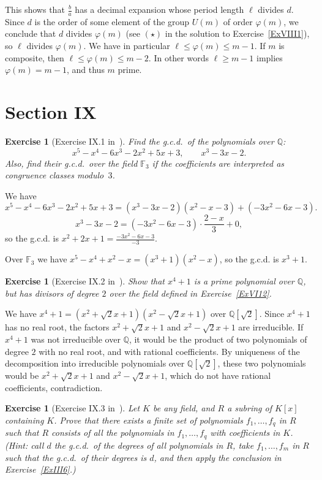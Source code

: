 \documentclass[12pt,letterpaper]{article}
\newcommand{\F}{\mathbb{F}}
\newcommand{\Q}{\mathbb{Q}}
\newtheorem{exer}[thm]{Exercise}
\theoremstyle{definition}
\begin{document}
This shows that $\frac{b}{a}$ has a decimal expansion whose period length $\ell$ divides $d$. Since $d$ is the order of some element of the group $U(m)$ of order $\varphi(m)$, we conclude that $d$ divides $\varphi(m)$ (see $(\star)$ in the solution to Exercise~\ref{ExVIII1}), so $\ell$ divides $\varphi(m)$. We have in particular $\ell\le\varphi(m)\le m-1$. If $m$ is composite, then $\ell\le\varphi(m)\le m-2$. In other words $\ell\ge m-1$ implies $\varphi(m)=m-1$, and thus $m$ prime. 

\section{Section IX} %

\begin{exer}[Exercise IX.1 in~\cite{weil1979}]
Find the g.c.d.\ of the polynomials over $\Q$:
\[
x^5-x^4-6x^3-2x^2+5x+3, \qquad x^3-3x-2.
\]
Also, find their g.c.d.\ over the field $\F_3$ if the coefficients are interpreted as congruence classes modulo~$3$.
\end{exer}

We have 
$$
x^5-x^4-6x^3-2x^2+5x+3=(x^3-3x-2)(x^2-x-3)+(-3x^2-6x-3).
$$ 
$$
x^3-3x-2=(-3x^2-6x-3)\cdot\frac{2-x}{3}+0,
$$ 
so the g.c.d. is $x^2+2x+1=\frac{-3 x^2 - 6 x - 3}{-3}$. 

Over $\F_3$ we have \(x^5-x^4+x^2-x=(x^3+1)(x^2-x)\), so the g.c.d. is \(x^3+1\). 

\begin{exer}[Exercise IX.2 in~\cite{weil1979}]
Show that $x^4+1$ is a prime polynomial over $\Q$, but has divisors of degree $2$ over the field defined in Exercise~\ref{ExVI12}.
\end{exer}

We have $x^4+1=(x^2+\sqrt{2}x+1)(x^2-\sqrt{2}x+1)$ over $\Q[\sqrt{2}]$. Since $x^4+1$ has no real root, the factors $x^2+\sqrt{2}x+1$ and $x^2-\sqrt{2}x+1$ are irreducible. If $x^4+1$ was not irreducible over $\Q$, it would be the product of two polynomials of degree $2$ with no real root, and with rational coefficients. By uniqueness of the decomposition into irreducible polynomials over $\Q[\sqrt{2}]$, these two polynomials would be $x^2+\sqrt{2}x+1$ and $x^2-\sqrt{2}x+1$, which do not have rational coefficients, contradiction. 

\begin{exer}[Exercise IX.3 in~\cite{weil1979}]
Let $K$ be any field, and $R$ a subring of $K[x]$ containing $K$. Prove that there exists a finite set of polynomials $f_1,\ldots,f_q$ in $R$ such that $R$ consists of all the polynomials in $f_1,\ldots,f_q$ with coefficients in $K$. (Hint: call $d$ the g.c.d.\ of the degrees of all polynomials in $R$, take $f_1,\ldots,f_m$ in $R$ such that the g.c.d.\ of their degrees is $d$, and then apply the conclusion in Exercise~\ref{ExIII6}.) 
\end{exer}
\end{document}
